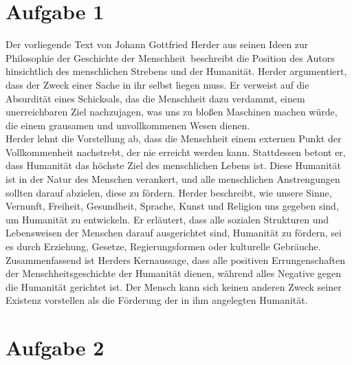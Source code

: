 \documentclass[12pt,a4paper]{report}
\begin{document}
	\large
	\section{Aufgabe 1}
	Der vorliegende Text von Johann Gottfried Herder aus seinen \dq Ideen zur Philosophie der Geschichte der Menschheit\dq\ beschreibt die Position des Autors hinsichtlich des menschlichen Strebens und der Humanität. 	Herder argumentiert, dass der Zweck einer Sache in ihr selbst liegen muss.
	Er verweist auf die Absurdität eines Schicksals, das die Menschheit dazu verdammt, einem unerreichbaren Ziel nachzujagen, was uns zu bloßen Maschinen machen würde, die einem grausamen und unvollkommenen Wesen dienen.
	\\
	Herder lehnt die Vorstellung ab, dass die Menschheit einem externen Punkt der Vollkommenheit nachstrebt, der nie erreicht werden kann. Stattdessen betont er, dass Humanität das höchste Ziel des menschlichen Lebens ist. 	Diese Humanität ist in der Natur des Menschen verankert, und alle menschlichen Anstrengungen sollten darauf abzielen, diese zu fördern.
	Herder beschreibt, wie unsere Sinne, Vernunft, Freiheit, Gesundheit, Sprache, Kunst und Religion uns gegeben sind, um Humanität zu entwickeln.
	Er erläutert, dass alle sozialen Strukturen und Lebensweisen der Menschen darauf ausgerichtet sind, Humanität zu fördern, sei es durch Erziehung, Gesetze, Regierungsformen oder kulturelle Gebräuche.
	\\
	Zusammenfassend ist Herders Kernaussage, dass alle positiven Errungenschaften der Menschheitsgeschichte der Humanität dienen, während alles Negative gegen die Humanität gerichtet ist.
	Der Mensch kann sich keinen anderen Zweck seiner Existenz vorstellen als die Förderung der in ihm angelegten Humanität.

	\section{Aufgabe 2}
\end{document}
